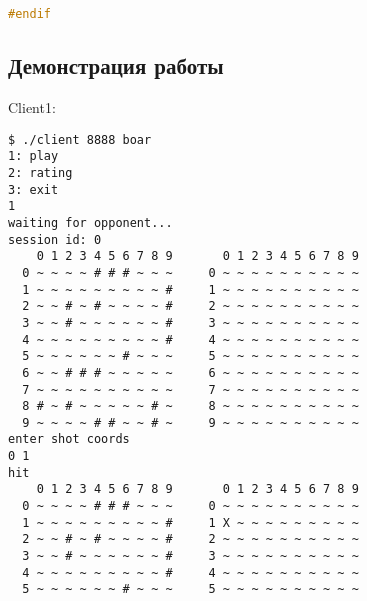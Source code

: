 \documentclass[12pt]{article}
\begin{document}
\begin{lstlisting}[language=C, basicstyle=\scriptsize]
#endif
\end{lstlisting}


\subsection*{Демонстрация работы}

Client1:
\begin{lstlisting}
$ ./client 8888 boar
1: play                                                                         
2: rating                                                                       
3: exit                                                                      
1                                                                            
waiting for opponent...                                                       
session id: 0                                                                   
    0 1 2 3 4 5 6 7 8 9       0 1 2 3 4 5 6 7 8 9                               
  0 ~ ~ ~ ~ # # # ~ ~ ~     0 ~ ~ ~ ~ ~ ~ ~ ~ ~ ~                               
  1 ~ ~ ~ ~ ~ ~ ~ ~ ~ #     1 ~ ~ ~ ~ ~ ~ ~ ~ ~ ~                              
  2 ~ ~ # ~ # ~ ~ ~ ~ #     2 ~ ~ ~ ~ ~ ~ ~ ~ ~ ~                               
  3 ~ ~ # ~ ~ ~ ~ ~ ~ #     3 ~ ~ ~ ~ ~ ~ ~ ~ ~ ~                              
  4 ~ ~ ~ ~ ~ ~ ~ ~ ~ #     4 ~ ~ ~ ~ ~ ~ ~ ~ ~ ~                               
  5 ~ ~ ~ ~ ~ ~ # ~ ~ ~     5 ~ ~ ~ ~ ~ ~ ~ ~ ~ ~                               
  6 ~ ~ # # # ~ ~ ~ ~ ~     6 ~ ~ ~ ~ ~ ~ ~ ~ ~ ~                               
  7 ~ ~ ~ ~ ~ ~ ~ ~ ~ ~     7 ~ ~ ~ ~ ~ ~ ~ ~ ~ ~                              
  8 # ~ # ~ ~ ~ ~ ~ # ~     8 ~ ~ ~ ~ ~ ~ ~ ~ ~ ~                              
  9 ~ ~ ~ ~ # # ~ ~ # ~     9 ~ ~ ~ ~ ~ ~ ~ ~ ~ ~                                                                                     
enter shot coords                                                            
0 1                                                                             
hit                                                                             
    0 1 2 3 4 5 6 7 8 9       0 1 2 3 4 5 6 7 8 9                               
  0 ~ ~ ~ ~ # # # ~ ~ ~     0 ~ ~ ~ ~ ~ ~ ~ ~ ~ ~                               
  1 ~ ~ ~ ~ ~ ~ ~ ~ ~ #     1 X ~ ~ ~ ~ ~ ~ ~ ~ ~                               
  2 ~ ~ # ~ # ~ ~ ~ ~ #     2 ~ ~ ~ ~ ~ ~ ~ ~ ~ ~                               
  3 ~ ~ # ~ ~ ~ ~ ~ ~ #     3 ~ ~ ~ ~ ~ ~ ~ ~ ~ ~                               
  4 ~ ~ ~ ~ ~ ~ ~ ~ ~ #     4 ~ ~ ~ ~ ~ ~ ~ ~ ~ ~                               
  5 ~ ~ ~ ~ ~ ~ # ~ ~ ~     5 ~ ~ ~ ~ ~ ~ ~ ~ ~ ~                               

\end{lstlisting}
\end{document}

